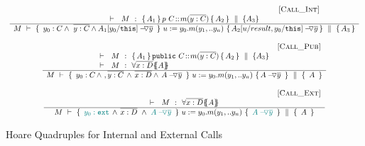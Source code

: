 {\begin{figure}[htb]
$\begin{array}{c}
 \inferruleSD{\hspace{4.7cm} [\sc{Call\_Int}]}
	{
	   	\begin{array}{l}
		\promises  M {\mprepostN{A_1}{p\ C}{m}{y}{C}{A_2} {A_3}}  
          	\end{array}
		}
	{  \hprovesN {M} 
						{ \  y_0:C  \wedge\ \overline {y:C} \wedge {\PushAS {y}{A_1[y_0/\prg{this}]}}  \ } %
						{ \ u:=y_0.m(y_1,.. y_n)\    }
						{  { \PushAS {y}{A_2[ u/result,y_0/\prg{this}]}}   }
						{  {A_3} }	
}
 \\
\\
 \inferruleSD{\hspace{4.7cm} [\sc{Call\_Pub}]}
	{
	   	\begin{array}{l}
		\promises  M {\mprepostN{A_1}{\prg{public}\ C}{m}{y}{C}{A_2} {A_3} } \\
		 \promises M   {\TwoStatesN {\overline {x:D}} {A}} 
          	\end{array}
		}
	{  \hprovesN {M} 
						{ \  y_0:C  \, \wedge\ ,\overline {y:C}\, \wedge \,  \overline{x:D}  \wedge\, {\PushAS {y}{A}}\ }
						{ \ u:=y_0.m(y_1,.. y_n)\    }
						{    {\PushAS {y}{A}} \ }
						{  {\   A\ }} 	
}
\\
 \\ 
 \inferruleSD{\hspace{4.7cm} [\sc{Call\_Ext}]}
 	{ 
   	 \promises M   {\TwoStatesN {\overline {x:D}} {A}} 
        }
	{   \hprovesN{M} 
						{ \    \sdN{ \external{y_0}} \,     \wedge \,  \overline{x:D}\  \wedge\ \sdN{\PushAS {y}{A}}\ }  
						{ \ u:=y_0.m(y_1,.. y_n)\    }
						{ \   \sdN{\PushAS {y}{A}}  \ }
						{\  A \   }	
}

\end{array}
$
\caption{Hoare Quadruples for Internal and External Calls}
\label{f:internal:calls}
\label{f:external:calls}
\label{f:calls}
\end{figure}

}
